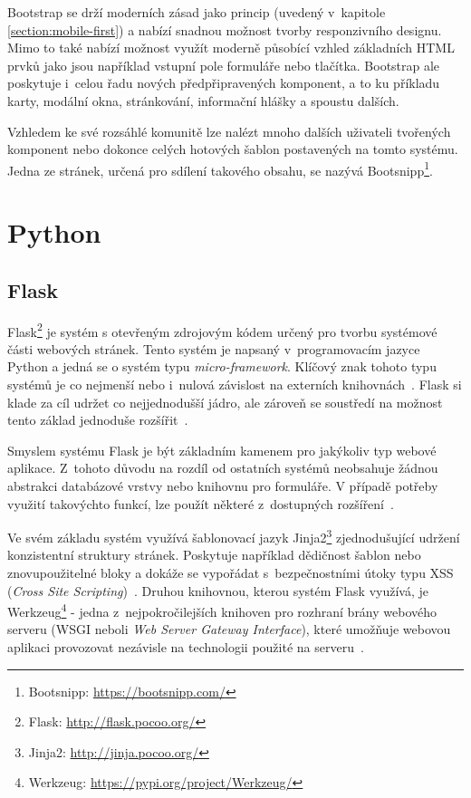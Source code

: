 Bootstrap se drží moderních zásad jako princip  (uvedený v~kapitole \ref{section:mobile-first}) a nabízí snadnou možnost tvorby responzivního designu. Mimo to také nabízí možnost využít moderně působící vzhled základních HTML prvků jako jsou například vstupní pole formuláře nebo tlačítka. Bootstrap ale poskytuje i~celou řadu nových předpřipravených komponent, a to ku příkladu karty, modální okna, stránkování, informační hlášky a spoustu dalších.

Vzhledem ke své rozsáhlé komunitě lze nalézt mnoho dalších uživateli tvořených komponent nebo dokonce celých hotových šablon postavených na tomto systému. Jedna ze stránek, určená pro sdílení takového obsahu, se nazývá Bootsnipp\footnote{Bootsnipp: \url{https://bootsnipp.com/}}.



\section{Python}
\blindtext[2]


\subsection{Flask}
Flask\footnote{Flask: \url{http://flask.pocoo.org/}} je systém s otevřeným zdrojovým kódem určený pro tvorbu systémové části webových stránek. Tento systém je napsaný v~programovacím jazyce Python a jedná se o systém typu \emph{micro-framework}. Klíčový znak tohoto typu systémů je co nejmenší nebo i~nulová závislost na externích knihovnách~\cite{bib:flask-doc}.
Flask si klade za cíl udržet co nejjednodušší jádro, ale zároveň se soustředí na možnost tento základ jednoduše rozšířit~\cite{bib:flask-pym}.

Smyslem systému Flask je být základním kamenem pro jakýkoliv typ webové aplikace. Z~tohoto důvodu na rozdíl od ostatních systémů neobsahuje žádnou abstrakci databázové vrstvy nebo knihovnu pro formuláře. V případě potřeby využití takovýchto funkcí, lze použít některé z~dostupných rozšíření~\cite{bib:flask-design}.

Ve svém základu systém využívá šablonovací jazyk Jinja2\footnote{Jinja2: \url{http://jinja.pocoo.org/}} zjednodušující udržení konzistentní struktury stránek. Poskytuje například dědičnost šablon nebo znovupoužitelné bloky a dokáže se vypořádat s~bezpečnostními útoky typu XSS (\emph{Cross Site Scripting})~\cite{bib:jinja}.
Druhou knihovnou, kterou systém Flask využívá, je Werkzeug\footnote{Werkzeug: \url{https://pypi.org/project/Werkzeug/}} - jedna z~nejpokročilejších knihoven pro rozhraní brány webového serveru (WSGI neboli \emph{Web Server Gateway Interface}), které umožňuje webovou aplikaci provozovat nezávisle na technologii použité na serveru~\cite{bib:flask-pep}.

